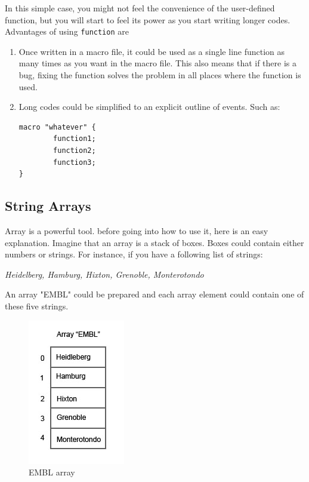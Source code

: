 \documentclass[11pt,a4paper,oneside]{report}
\newcommand{\ilcom}[1]{\texttt{\small#1}}
\begin{document}
In this simple case, 
you might not feel the convenience of the user-defined function, 
but you will start to feel its power as you start writing longer codes. 
Advantages of using \ilcom{function} are
\begin{enumerate} 
\item Once written in a macro file, it could be used as a single line function 
as many times as you want in the macro file. This also means that if there is a bug, 
fixing the function solves the problem in all places where the function is used.
\item Long codes could be simplified to an explicit outline of events. Such as:
\begin{lstlisting}[numbers=none]
macro "whatever" {
    	function1;
		function2;
		function3;
}
\end{lstlisting}
\end{enumerate}
   \subsection{String Arrays}
Array is a powerful tool. before going into how to use it, here is an easy explanation. 
Imagine that an array is a stack of boxes. Boxes could contain either numbers or strings. 
For instance, if you have a following list of strings:

\textit{Heidelberg, Hamburg, Hixton, Grenoble, Monterotondo}

An array "EMBL" could be prepared and each array element could contain one of these five strings. 

\begin{figure}[htbp]
\begin{center}
\includegraphics[scale=0.6]{fig/fig2441_arrayScheme.jpg}
\caption{EMBL array}
\label{figEMBLarray}
\end{center}
\end{figure} 
 
\end{document}
